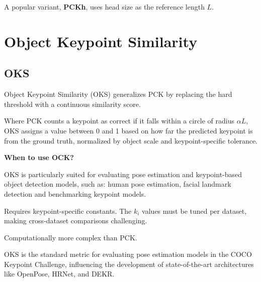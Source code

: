 {A popular variant, \textbf{PCKh}, uses head size as the reference length \(L\). }

\clearpage
\thispagestyle{cvstyle}
\section{Object Keypoint Similarity}
\subsection{OKS}

Object Keypoint Similarity (OKS) generalizes PCK by replacing the hard threshold with a continuous similarity score.  

Where PCK counts a keypoint as correct if it falls within a circle of radius $\alpha L$, OKS assigns a value between 0 and 1 based on how far the predicted keypoint is from the ground truth, normalized by object scale and keypoint-specific tolerance.

\noindent
{}

\textbf{When to use OCK?}

OKS is particularly suited for evaluating pose estimation and keypoint-based object detection models, such as: human pose
estimation, facial landmark detection and benchmarking keypoint models.


{
\item Requires keypoint-specific constants. The $k_i$ values must be tuned per dataset, making cross-dataset comparisons
challenging.
\item Computationally more complex than PCK.
}

\clearpage
{}
{OKS is the standard metric for evaluating pose estimation models in the COCO Keypoint Challenge, influencing the development
of state-of-the-art architectures like OpenPose, HRNet, and DEKR.}


